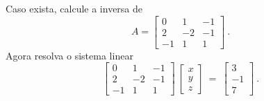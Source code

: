\begin{problem}
Caso exista, calcule a inversa de 
$$A = \left[\begin{array}{rrr}
  0 &  1 & -1  \\
  2 & -2 & -1  \\
 -1 &  1 &  1  \end{array}\right]\ . $$
Agora resolva o sistema linear 
$$\left[\begin{array}{rrr}
  0 &  1 & -1  \\
  2 & -2 & -1  \\
 -1 &  1 &  1  \end{array}\right] \ 
\left[\begin{array}{ccc} x \\ y \\ z \end{array}\right] \ = \ 
\left[\begin{array}{rrr} 3 \\ -1 \\ 7 \end{array}\right]\ .$$
\end{problem}
